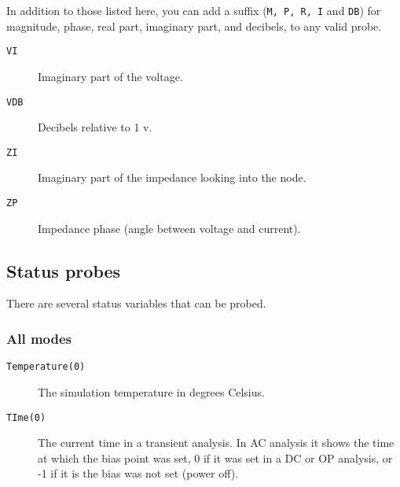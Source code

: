 In addition to those listed here, you can add a suffix ({\tt M, P, R,
I} and {\tt DB}) for magnitude, phase, real part, imaginary part, and
decibels, to any valid probe.

\begin{description}

\item[{\tt VI}] Imaginary part of the voltage.

\item[{\tt VDB}] Decibels relative to 1 v.

\item[{\tt ZI}] Imaginary part of the impedance looking into the node.

\item[{\tt ZP}] Impedance phase (angle between voltage and current).  

\end{description}
\subsection{Status probes}

There are several status variables that can be probed.
\subsubsection{All modes}

\begin{description}

\item[{\tt Temperature(0)}] The simulation temperature in degrees Celsius.

\item[{\tt TIme(0)}] The current time in a transient analysis.  In AC
analysis it shows the time at which the bias point was set, 0 if it was set
in a DC or OP analysis, or -1 if it is the bias was not set (power off).

\end{description}

